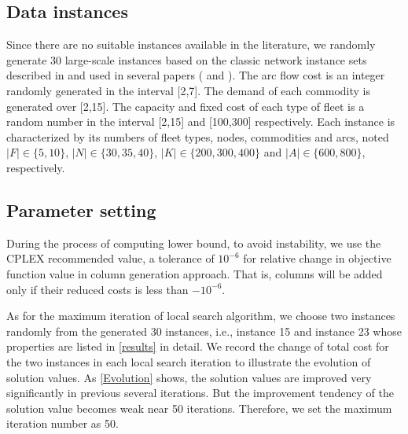 \documentclass[11pt,nonblindrev,fleqn]{article}
\begin{document}
\subsection{Data instances}
Since there are no suitable instances available in the literature, we randomly generate 30 large-scale instances based on the classic network instance sets described in \cite{crainic2001bundle} and used in several papers (\cite{Ghamlouche2003Cycle,Pedersen2009Models} and \cite{Chouman2015Cutting}). The arc flow cost is an integer randomly generated in the interval [2,7]. The demand of each commodity is generated over [2,15]. The capacity and fixed cost of each type of fleet is a random number in the interval [2,15] and [100,300] respectively. Each instance is characterized by its numbers of fleet types, nodes, commodities and arcs, noted $|F|\in \{5,10\}$, $|N|\in \{30,35,40\}$, $|K|\in \{200,300,400\}$ and $|A|\in \{600,800\}$, respectively.

\subsection{Parameter setting}
During the process of computing lower bound, to avoid instability, we use the CPLEX recommended value, a tolerance of $10^{-6}$ for relative change in objective function value in column generation approach. That is, columns will be added only if their reduced costs is less than $-10^{-6}$.

As for the maximum iteration of local search algorithm, we choose two instances randomly from the generated 30 instances, i.e., instance 15 and instance 23 whose properties are listed in \autoref{results} in detail. We record the change of total cost for the two instances in each local search iteration to illustrate the evolution of solution values. As \autoref{Evolution} shows, the solution values are improved very significantly in previous several iterations. But the improvement tendency of the solution value becomes weak near 50 iterations. Therefore, we set the maximum iteration number as 50.
\end{document}
